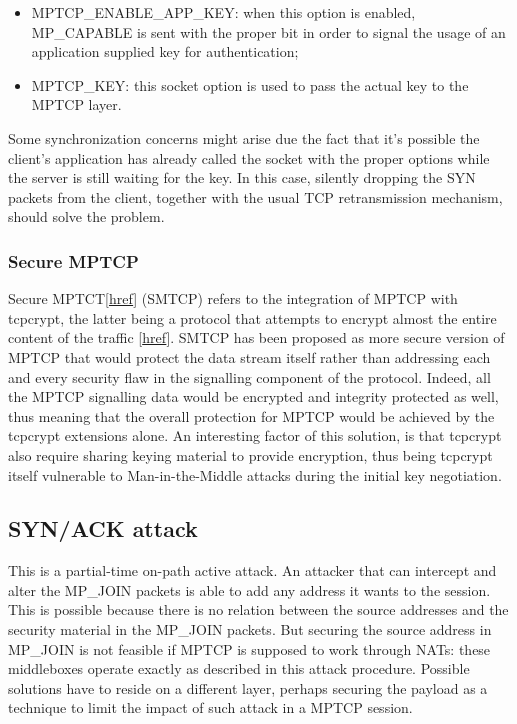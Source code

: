 \begin{itemize}
  \item MPTCP\_ENABLE\_APP\_KEY: when this option is enabled, MP\_CAPABLE is sent with the proper bit in order to signal the usage of an application supplied key for authentication;
  \item MPTCP\_KEY: this socket option is used to pass the actual key to the MPTCP layer.
\end{itemize}

Some synchronization concerns might arise due the fact that it's possible the client's application has already called the socket with the proper options while the server is still waiting for the key. In this case, silently dropping the SYN packets from the client, together with the usual TCP retransmission mechanism, should solve the problem.

\subsubsection{Secure MPTCP}
Secure MPTCT[\href{https://tools.ietf.org/html/draft-bagnulo-mptcp-secure-00}{href}] (SMTCP) refers to the integration of MPTCP with tcpcrypt, the latter being a protocol that attempts to encrypt almost the entire content of the traffic [\href{http://www.tcpcrypt.org/}{href}]. SMTCP has been proposed as more secure version of MPTCP that would protect the data stream itself rather than addressing each and every security flaw in the signalling component of the protocol. Indeed, all the MPTCP signalling data would be encrypted and integrity protected as well, thus meaning that the overall protection for MPTCP would be achieved by the tcpcrypt extensions alone. An interesting factor of this solution, is that tcpcrypt also require sharing keying material to provide encryption, thus being tcpcrypt itself vulnerable to Man-in-the-Middle attacks during the initial key negotiation.

\subsection{SYN/ACK attack}
This is a partial-time on-path active attack. An attacker that can intercept and alter the MP\_JOIN packets is able to add any address it wants to the session. This is possible because there is no relation between the source addresses and the security material in the MP\_JOIN packets. But securing the source address in MP\_JOIN is not feasible if MPTCP is supposed to work through NATs: these middleboxes operate exactly as described in this attack procedure. 
Possible solutions have to reside on a different layer, perhaps securing the payload as a technique to limit the impact of such attack in a MPTCP session.


